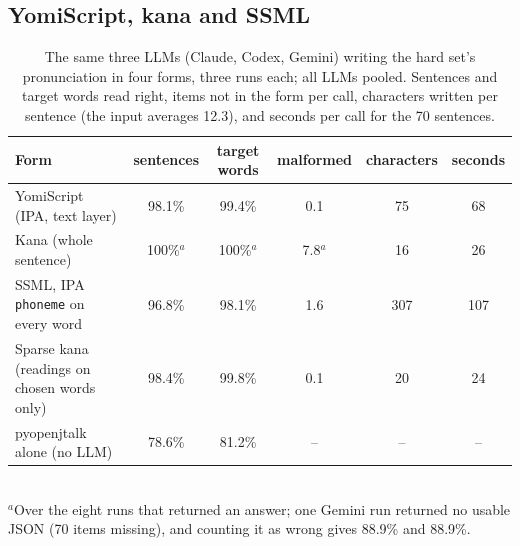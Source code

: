 \documentclass[11pt,a4paper]{article}
\begin{document}
\subsection{YomiScript, kana and SSML}\label{sec:representation}

\begin{table}[t]
\centering\small
\caption{The same three LLMs (Claude, Codex, Gemini) writing the hard set's pronunciation in four forms, three runs
each; all LLMs pooled. Sentences and target words read right, items not in the form per call, characters written per
sentence (the input averages 12.3), and seconds per call for the 70 sentences.}
\label{tab:representation}
\setlength{\tabcolsep}{4pt}
\begin{tabular}{lccccc}
\toprule
Form & sentences & target words & malformed & characters & seconds\\
\midrule
YomiScript (IPA, text layer) & 98.1\% & 99.4\% & 0.1 & 75 & 68\\
Kana (whole sentence) & 100\%$^{a}$ & 100\%$^{a}$ & 7.8$^{a}$ & 16 & 26\\
SSML, IPA \texttt{phoneme} on every word & 96.8\% & 98.1\% & 1.6 & 307 & 107\\
Sparse kana (readings on chosen words only) & 98.4\% & 99.8\% & 0.1 & 20 & 24\\
pyopenjtalk alone (no LLM) & 78.6\% & 81.2\% & -- & -- & --\\
\bottomrule
\end{tabular}\\[2pt]
{\footnotesize $^{a}$Over the eight runs that returned an answer; one Gemini run returned no usable JSON (70 items
missing), and counting it as wrong gives 88.9\% and 88.9\%.}
\end{table}
\end{document}
